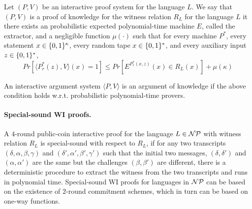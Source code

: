 { Let $(P, V )$ be an interactive proof system for the language
$L$. We say that $(P, V )$ is a proof of knowledge for the witness relation $R_L$ for the language $L$ it there
exists an probabilistic expected polynomial-time machine $E$, called the extractor, and a negligible
function $\mu(\cdot)$ such that for every machine $P^*$, every statement $x \in \{0,1\}^\kappa$, every random tape
$x \in \{0,1\}^*$, and every auxiliary input $z \in \{0,1\}^*$,
$$Pr [ \langle P^*_r(z), V \rangle(x) = 1]\leq Pr[E^{P^*_r(x,z)}(x) \in R_L(x)] + \mu(\kappa)$$
\ED

An interactive argument system $\langle P, V \rangle$ is an argument of knowledge if
the above condition holds w.r.t. probabilistic polynomial-time provers.

\paragraph{Special-sound WI proofs.} A $4$-round public-coin interactive proof for the language $L \in {{\cal NP}}$ with
witness relation $R_L$ is special-sound with respect to $R_L$, if for any two transcripts $(\delta,\alpha,\beta, \gamma)$ and $(\delta',\alpha',\beta', \gamma')$ such that the initial two messages, $(\delta,\delta')$ and $(\alpha,\alpha')$ are the same but the challenges $(\beta,\beta')$ are different, there is a deterministic procedure to extract the witness from the two transcripts
and runs in polynomial time. Special-sound WI proofs for languages in ${{\cal NP}}$ can be based on
the existence of $2$-round commitment schemes, which in turn can be based on one-way functions.
}
